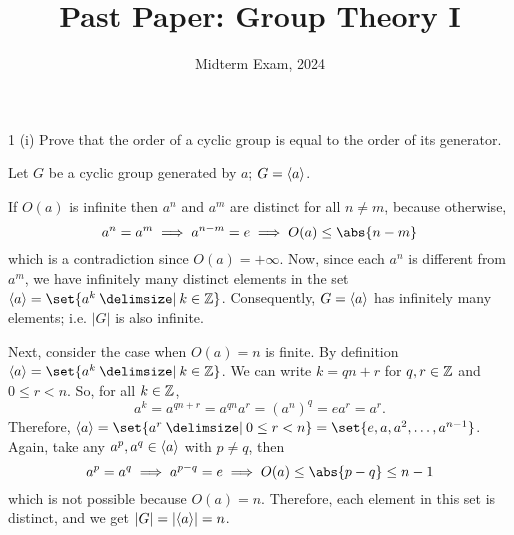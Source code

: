\documentclass[11pt]{penrose}
\title{Past Paper: Group Theory I}
\subtitle{Midterm Exam, 2024}
\begin{document}
\maketitle
\warningtext

\begin{problem}{1 (i)}
    Prove that the order of a cyclic group is equal to the order of its generator.

    \solution Let $G$ be a cyclic group generated by $a$; $G = \langle a\rangle$.

    If $O(a)$ is infinite then $a^n$ and $a^m$ are distinct for all $n \neq m$, because otherwise,
    \begin{equation*}
        a^n = a^m \implies a^{n - m} = e \implies O(a) \leq \abs{n-m}
    \end{equation*}
    which is a contradiction since $O(a) = +\infty$. Now, since each $a^n$ is different from $a^{m}$, we have infinitely many distinct elements in the set $\cyclic{a} = \set{a^k \st k \in \Z}$. Consequently, $G = \langle a\rangle$ has infinitely many elements; i.e. $|G|$ is also infinite.

    Next, consider the case when $O(a) = n$ is finite. By definition $\cyclic{a} = \set{a^k \st k \in \Z}$. We can write $k = qn + r$ for $q, r \in \mathbb{Z}$ and $0 \leq r < n$. So, for all $k \in \mathbb{Z}$,
    \begin{equation*}
        a^k = a^{qn+r} = a^{qn} a^r = (a^{n})^{q} = e a^r = a^r.
    \end{equation*}
    Therefore, $\cyclic{a} = \set{a^r \st 0 \leq r < n} = \set{e, a, a^2, \dots, a^{n-1}}$. Again, take any $a^p, a^q \in \langle a\rangle$ with $p \neq q$, then
    \begin{equation*}
        a^p = a^q \implies a^{p - q} = e \implies O(a) \leq \abs{p-q} \leq n-1
    \end{equation*}
    which is not possible because $O(a) = n$. Therefore, each element in this set is distinct, and we get $|G| = |\langle a\rangle| = n$.
\end{problem}
\end{document}
